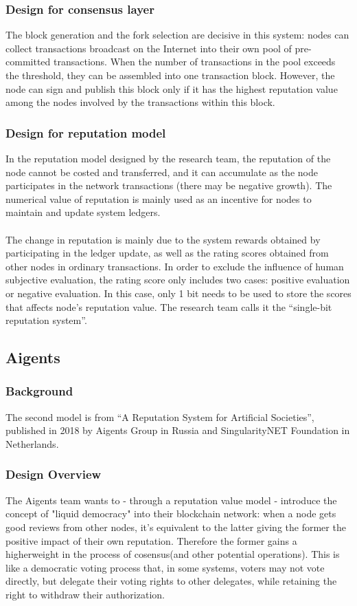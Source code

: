\documentclass[doublespacing]{bmcart}
\begin{document}
\begin{CJK*}{UTF8}{gbsn}
		\subsubsection*{Design for consensus layer}  
	The block generation and the fork selection are decisive in this system: nodes can collect transactions broadcast on the Internet into their own pool of pre-committed transactions. When the number of transactions in the pool exceeds the threshold, they can be assembled into one transaction block. However, the node can sign and publish this block only if it has the highest reputation value among the nodes involved by the transactions within this block.
	\subsubsection*{Design for reputation model} 
	In the reputation model designed by the research team, the reputation of the node cannot be costed and transferred, and it can accumulate as the node participates in the network transactions (there may be negative growth). The numerical value of reputation is mainly used as an incentive for nodes to maintain and update system ledgers.
	\paragraph{} 
	The change in reputation is mainly due to the system rewards obtained by participating in the ledger update, as well as the rating scores obtained from other nodes in ordinary transactions. In order to exclude the influence of human subjective evaluation, the rating score only includes two cases: positive evaluation or negative evaluation. In this case, only 1 bit needs to be used to store the scores that affects node’s reputation value. The research team calls it the ``single-bit reputation system''.
	
	\subsection{Aigents} 
	\subsubsection*{Background}
	The second model is from ``A Reputation System for Artificial Societies'', published in 2018 by Aigents Group in Russia and SingularityNET Foundation in Netherlands.
	\subsubsection*{Design Overview}
	The Aigents team wants to - through a reputation value model - introduce the concept of "liquid democracy" into their blockchain network: when a node gets good reviews from other nodes, it's equivalent to the latter giving the former the positive impact of their own reputation. Therefore the former gains a higherweight in the process of cosensus(and other potential operations). This is like a democratic voting process that, in some systems, voters may not vote directly, but delegate their voting rights to other delegates, while retaining the right to withdraw their authorization.

\end{CJK*}
\end{document}
